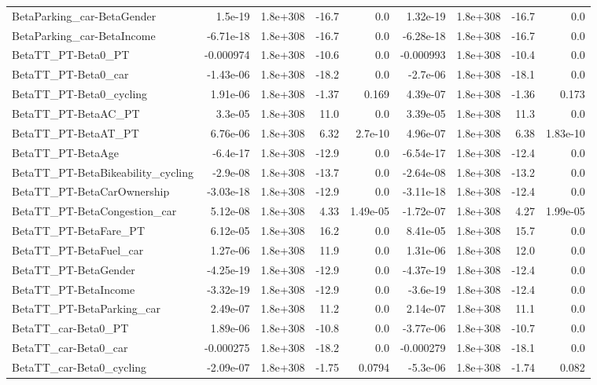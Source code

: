 \begin{tabular}{lrrrrrrrr}
BetaParking_car-BetaGender & 1.5e-19 & 1.8e+308 & -16.7 & 0.0 & 1.32e-19 & 1.8e+308 & -16.7 & 0.0 \\
BetaParking_car-BetaIncome & -6.71e-18 & 1.8e+308 & -16.7 & 0.0 & -6.28e-18 & 1.8e+308 & -16.7 & 0.0 \\
BetaTT_PT-Beta0_PT & -0.000974 & 1.8e+308 & -10.6 & 0.0 & -0.000993 & 1.8e+308 & -10.4 & 0.0 \\
BetaTT_PT-Beta0_car & -1.43e-06 & 1.8e+308 & -18.2 & 0.0 & -2.7e-06 & 1.8e+308 & -18.1 & 0.0 \\
BetaTT_PT-Beta0_cycling & 1.91e-06 & 1.8e+308 & -1.37 & 0.169 & 4.39e-07 & 1.8e+308 & -1.36 & 0.173 \\
BetaTT_PT-BetaAC_PT & 3.3e-05 & 1.8e+308 & 11.0 & 0.0 & 3.39e-05 & 1.8e+308 & 11.3 & 0.0 \\
BetaTT_PT-BetaAT_PT & 6.76e-06 & 1.8e+308 & 6.32 & 2.7e-10 & 4.96e-07 & 1.8e+308 & 6.38 & 1.83e-10 \\
BetaTT_PT-BetaAge & -6.4e-17 & 1.8e+308 & -12.9 & 0.0 & -6.54e-17 & 1.8e+308 & -12.4 & 0.0 \\
BetaTT_PT-BetaBikeability_cycling & -2.9e-08 & 1.8e+308 & -13.7 & 0.0 & -2.64e-08 & 1.8e+308 & -13.2 & 0.0 \\
BetaTT_PT-BetaCarOwnership & -3.03e-18 & 1.8e+308 & -12.9 & 0.0 & -3.11e-18 & 1.8e+308 & -12.4 & 0.0 \\
BetaTT_PT-BetaCongestion_car & 5.12e-08 & 1.8e+308 & 4.33 & 1.49e-05 & -1.72e-07 & 1.8e+308 & 4.27 & 1.99e-05 \\
BetaTT_PT-BetaFare_PT & 6.12e-05 & 1.8e+308 & 16.2 & 0.0 & 8.41e-05 & 1.8e+308 & 15.7 & 0.0 \\
BetaTT_PT-BetaFuel_car & 1.27e-06 & 1.8e+308 & 11.9 & 0.0 & 1.31e-06 & 1.8e+308 & 12.0 & 0.0 \\
BetaTT_PT-BetaGender & -4.25e-19 & 1.8e+308 & -12.9 & 0.0 & -4.37e-19 & 1.8e+308 & -12.4 & 0.0 \\
BetaTT_PT-BetaIncome & -3.32e-19 & 1.8e+308 & -12.9 & 0.0 & -3.6e-19 & 1.8e+308 & -12.4 & 0.0 \\
BetaTT_PT-BetaParking_car & 2.49e-07 & 1.8e+308 & 11.2 & 0.0 & 2.14e-07 & 1.8e+308 & 11.1 & 0.0 \\
BetaTT_car-Beta0_PT & 1.89e-06 & 1.8e+308 & -10.8 & 0.0 & -3.77e-06 & 1.8e+308 & -10.7 & 0.0 \\
BetaTT_car-Beta0_car & -0.000275 & 1.8e+308 & -18.2 & 0.0 & -0.000279 & 1.8e+308 & -18.1 & 0.0 \\
BetaTT_car-Beta0_cycling & -2.09e-07 & 1.8e+308 & -1.75 & 0.0794 & -5.3e-06 & 1.8e+308 & -1.74 & 0.082 \\

\end{tabular}
